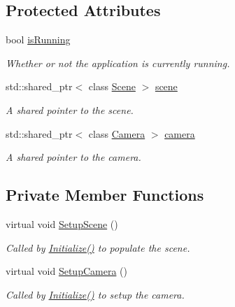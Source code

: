 \subsection*{Protected Attributes}
\begin{DoxyCompactItemize}
\item
bool \hyperlink{class_application_ae1c1ff7a7663d9baa9b65a7ba8e1dcf8}{is\+Running}
\begin{DoxyCompactList}\small\item\em Whether or not the application is currently running. \end{DoxyCompactList}\item
std\+::shared\+\_\+ptr$<$ class \hyperlink{class_scene}{Scene} $>$ \hyperlink{class_application_a88c6615107a5094bb93fa5f153f79554}{scene}
\begin{DoxyCompactList}\small\item\em A shared pointer to the scene. \end{DoxyCompactList}\item
std\+::shared\+\_\+ptr$<$ class \hyperlink{class_camera}{Camera} $>$ \hyperlink{class_application_a0e8589fcb13c520ba472473abe5a518d}{camera}
\begin{DoxyCompactList}\small\item\em A shared pointer to the camera. \end{DoxyCompactList}\end{DoxyCompactItemize}
\subsection*{Private Member Functions}
\begin{DoxyCompactItemize}
\item
virtual void \hyperlink{class_application_aa8e8017ef8dd86293c96d0645e66d440}{Setup\+Scene} ()
\begin{DoxyCompactList}\small\item\em Called by \hyperlink{class_application_a17cf1ea4552d26a1c20f7d98d793d41d}{Initialize()} to populate the scene. \end{DoxyCompactList}\item
virtual void \hyperlink{class_application_a2eb61ca027f223a5c5ad1bf982481193}{Setup\+Camera} ()
\begin{DoxyCompactList}\small\item\em Called by \hyperlink{class_application_a17cf1ea4552d26a1c20f7d98d793d41d}{Initialize()} to setup the camera. \end{DoxyCompactList}\end{DoxyCompactItemize}


